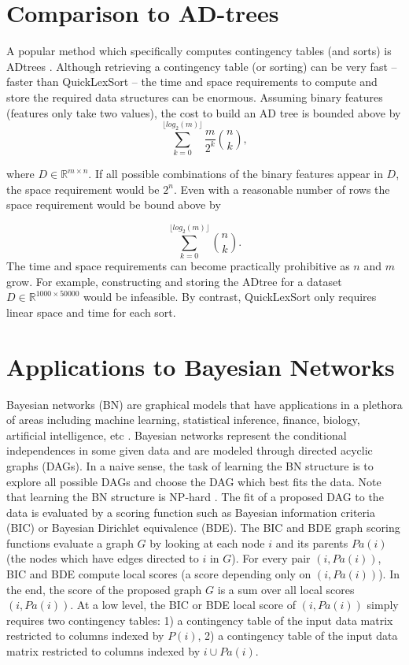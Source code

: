 \documentclass[a4paper,10pt,reqno]{amsart}
\newcommand\R{\mathbb R}
\theoremstyle{definition}
\begin{document}
\section{Comparison to AD-trees}
\label{sec:adtrees}
A popular method which specifically computes contingency tables (and sorts) is
ADtrees \cite{Moore:1998fk}. Although retrieving a contingency table (or
sorting) can be very fast -- faster than QuickLexSort -- the time and space
requirements to compute and store the required data structures can be enormous. Assuming
binary features (features only take two values), the cost to build an AD
tree is bounded above by 
\begin{equation} 
\sum_{k=0}^{\lfloor log_2(m) \rfloor} \frac{m}{2^k} { n \choose k }, 
\label{eq:ad1}
\end{equation} 

where $D \in \R^{m \times n}$. If all possible combinations
of the binary features appear in $D$, the space requirement would be $2^n$.
Even with a reasonable number of rows the space requirement would be bound
above by 

\begin{equation} 
    \sum_{k=0}^{\lfloor log_2(m) \rfloor} { n \choose k }. 
\label{eq:ad2}
\end{equation} 
The time
and space requirements can become practically prohibitive as $n$ and $m$ grow.
For example, constructing and storing the ADtree for a dataset $D \in \R^{1000
\times 50000}$ would be infeasible.  By contrast, QuickLexSort only requires
linear space and time for each sort.


\section{Applications to Bayesian Networks}
\label{sec:bn}
Bayesian networks (BN) are graphical models that have applications in a
plethora of areas including machine learning, statistical inference, finance,
biology, artificial intelligence, etc \cite{kollar2009probabilistic,
studeny2005probabilistic}. Bayesian networks represent the conditional
independences in some given data and are modeled through directed acyclic
graphs (DAGs). In a naive sense, the task of learning the BN structure is to
explore all possible DAGs and choose the DAG which best fits the data. Note
that learning the BN structure is NP-hard \cite{chickering1996learning,chickering2004large}. The fit
of a proposed DAG to the data is evaluated by a scoring function such as
Bayesian information criteria (BIC) or Bayesian Dirichlet equivalence (BDE). 
The BIC and BDE graph scoring functions evaluate a graph $G$ by looking
at each node $i$ and its parents $Pa(i)$ (the nodes which have edges directed
to $i$ in $G$). For every pair $(i,Pa(i))$, BIC and BDE compute local scores (a
score depending only on $(i,Pa(i))$). In the end, the score of the proposed
graph $G$ is a sum over all local scores $(i,Pa(i))$.  At
a low level, the BIC or BDE local score of $(i,Pa(i))$ simply requires two
contingency tables: 1) a contingency table of the input data matrix restricted
to columns indexed by $P(i)$, 2) a contingency table of the input data matrix
restricted to columns indexed by $i \cup Pa(i)$.
\end{document}
